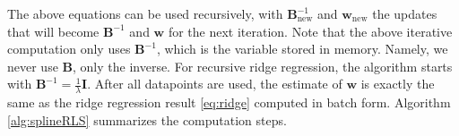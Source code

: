 \documentclass[10pt,a4paper]{article} %
\newcommand{\trsp}{{\scriptscriptstyle\top}}
\newcommand{\new}{{\!\scriptscriptstyle\mathrm{new}}}
\begin{document}
The above equations can be used recursively, with $\bm{B}_\new^{-1}$ and $\bm{w}_\new$ the updates that will become $\bm{B}^{-1}$ and $\bm{w}$ for the next iteration. Note that the above iterative computation only uses $\bm{B}^{-1}$, which is the variable stored in memory. Namely, we never use $\bm{B}$, only the inverse. For recursive ridge regression, the algorithm starts with $\bm{B}^{-1}=\frac{1}{\lambda}\bm{I}$. After all datapoints are used, the estimate of $\bm{w}$ is exactly the same as the ridge regression result \eqref{eq:ridge} computed in batch form. Algorithm \ref{alg:splineRLS} summarizes the computation steps.



\end{document}
